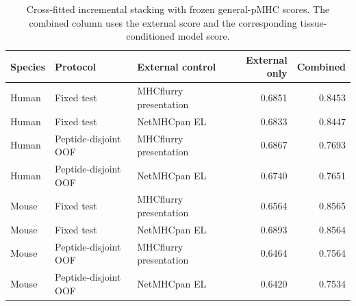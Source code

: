 \begin{table}[htbp]
\centering
\caption{Cross-fitted incremental stacking with frozen general-pMHC scores. The combined column uses the external score and the corresponding tissue-conditioned model score.}
\label{tab:appendix-general-stacking}
\footnotesize
\setlength{\tabcolsep}{3pt}
\begin{tabular}{lllrr}
\toprule
Species & Protocol & External control & External only & Combined \\
\midrule
Human & Fixed test & MHCflurry presentation & 0.6851 & 0.8453 \\
Human & Fixed test & NetMHCpan EL & 0.6833 & 0.8447 \\
Human & Peptide-disjoint OOF & MHCflurry presentation & 0.6867 & 0.7693 \\
Human & Peptide-disjoint OOF & NetMHCpan EL & 0.6740 & 0.7651 \\
Mouse & Fixed test & MHCflurry presentation & 0.6564 & 0.8565 \\
Mouse & Fixed test & NetMHCpan EL & 0.6893 & 0.8564 \\
Mouse & Peptide-disjoint OOF & MHCflurry presentation & 0.6464 & 0.7564 \\
Mouse & Peptide-disjoint OOF & NetMHCpan EL & 0.6420 & 0.7534 \\
\bottomrule
\end{tabular}
\end{table}
